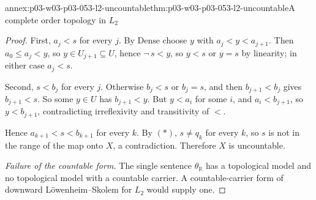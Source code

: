 \begin{annexitem}{annex:p03-w03-p03-053-l2-uncountable}{thm:p03-w03-p03-053-l2-uncountable}{A complete order topology in \(L_2\)}
\begin{proof}
First, \(a_j<s\) for every \(j\). By \(\mathrm{Dense}\) choose \(y\) with
\(a_j<y<a_{j+1}\). Then \(a_0\le a_j<y\), so \(y\in U_{j+1}\subseteq U\),
hence \(\neg\,s<y\), so \(y<s\) or \(y=s\) by linearity; in either case
\(a_j<s\).

Second, \(s<b_j\) for every \(j\). Otherwise \(b_j<s\) or \(b_j=s\), and
then \(b_{j+1}<b_j\) gives \(b_{j+1}<s\). So some \(y\in U\) has
\(b_{j+1}<y\). But \(y<a_i\) for some \(i\), and \(a_i<b_{j+1}\), so
\(y<b_{j+1}\), contradicting irreflexivity and transitivity of \(<\).

Hence \(a_{k+1}<s<b_{k+1}\) for every \(k\). By \((\ast)\),
\(s\neq q_k\) for every \(k\), so \(s\) is not in the range of the map
onto \(X\), a contradiction. Therefore \(X\) is uncountable.

\emph{Failure of the countable form.} The single sentence
\(\theta_{\mathbb R}\) has a topological model and no topological model
with a countable carrier. A countable-carrier form of downward
L\"owenheim--Skolem for \(L_2\) would supply one.
\end{proof}
\end{annexitem}


